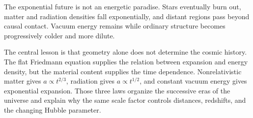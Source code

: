 The exponential future is not an energetic paradise. Stars eventually burn
out, matter and radiation densities fall exponentially, and distant regions
pass beyond causal contact. Vacuum energy remains while ordinary structure
becomes progressively colder and more dilute.

\begin{classroomqa}
\end{classroomqa}

The central lesson is that geometry alone does not determine the cosmic
history. The flat Friedmann equation supplies the relation between expansion
and energy density, but the material content supplies the time dependence.
Nonrelativistic matter gives \(a\propto t^{2/3}\), radiation gives
\(a\propto t^{1/2}\), and constant vacuum energy gives exponential expansion.
Those three laws organize the successive eras of the universe and explain why
the same scale factor controls distances, redshifts, and the changing Hubble
parameter.
